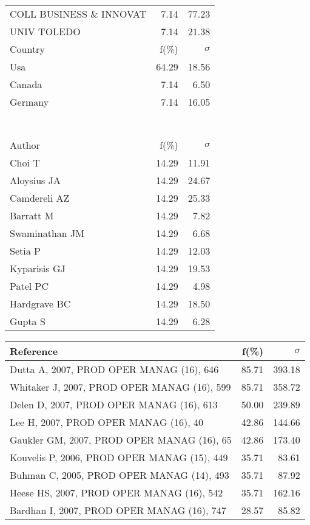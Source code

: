 \documentclass[a4paper,11pt]{report}
\begin{document}
\begin{landscape}
\begin{table}[!ht]
{\begin{tabular}{|l r r|}
COLL BUSINESS \& INNOVAT & 7.14 & 77.23\\
UNIV TOLEDO & 7.14 & 21.38\\
\hline
\hline
Country & f(\%) & $\sigma$\\
\hline
Usa & 64.29 & 18.56\\
Canada & 7.14 & 6.50\\
Germany & 7.14 & 16.05\\
 &  & \\
 &  & \\
 &  & \\
 &  & \\
 &  & \\
 &  & \\
 &  & \\
\hline
\hline
Author & f(\%) & $\sigma$\\
\hline
Choi T & 14.29 & 11.91\\
Aloysius JA & 14.29 & 24.67\\
Camdereli AZ & 14.29 & 25.33\\
Barratt M & 14.29 & 7.82\\
Swaminathan JM & 14.29 & 6.68\\
Setia P & 14.29 & 12.03\\
Kyparisis GJ & 14.29 & 19.53\\
Patel PC & 14.29 & 4.98\\
Hardgrave BC & 14.29 & 18.50\\
Gupta S & 14.29 & 6.28\\
\hline
\end{tabular}
}
{\scriptsize\begin{tabular}{|l r r|}
\hline
Reference & f(\%) & $\sigma$\\
\hline
Dutta A, 2007, PROD OPER MANAG (16), 646 & 85.71 & 393.18\\
Whitaker J, 2007, PROD OPER MANAG (16), 599 & 85.71 & 358.72\\
Delen D, 2007, PROD OPER MANAG (16), 613 & 50.00 & 239.89\\
Lee H, 2007, PROD OPER MANAG (16), 40 & 42.86 & 144.66\\
Gaukler GM, 2007, PROD OPER MANAG (16), 65 & 42.86 & 173.40\\
Kouvelis P, 2006, PROD OPER MANAG (15), 449 & 35.71 & 83.61\\
Buhman C, 2005, PROD OPER MANAG (14), 493 & 35.71 & 87.92\\
Heese HS, 2007, PROD OPER MANAG (16), 542 & 35.71 & 162.16\\
Bardhan I, 2007, PROD OPER MANAG (16), 747 & 28.57 & 85.82\\

\end{tabular}}
\end{table}
\end{landscape}
\end{document}
